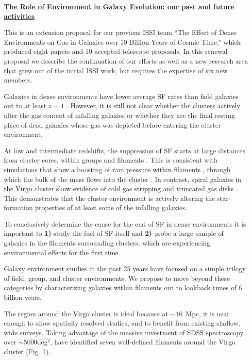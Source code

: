 \documentclass[11pt]{article}
\begin{document}
\centerline{{\bf \underline{ The Role of Environment in Galaxy Evolution: our past and future activities}}}
\medskip

This is an extension proposal for our previous ISSI team ``The Effect of Dense Environments on Gas in Galaxies over 10 Billion Years of Cosmic Time," which produced eight papers and 10 accepted telescope proposals.    In this renewal proposal we describe the continuation of our efforts as well as a new research area that grew out of the initial ISSI work, but requires the expertise of six new members. 

 Galaxies in dense environments
have lower average SF rates than field galaxies out
to at least $z \sim 1$ \citep[e.g.][]{Poggianti99,Lewis02,Gomez03,Postman05}.
However, it
is still not clear whether the clusters actively alter the gas content
of infalling galaxies or whether they are the final resting place of
dead galaxies whose gas was depleted before entering the cluster
environment.

At low and intermediate redshifts, the suppression of SF starts at large distances from cluster cores, within groups and filaments \citep{Lewis02,Gomez03,Laigle17}.  This is consistent with simulations that show a boosting of ram pressure within filaments \citep{Bahe13}, through which the bulk of the mass flows into the cluster \citep{Ramachandra15}. In contrast, spiral galaxies
in the Virgo cluster show evidence of cold gas stripping and truncated
gas disks
\citep{Koopmann98,Koopmann04,Dale01,Crowl05,Chung07}.  This
demonstrates that the cluster environment is actively altering the
star-formation properties of at least some of the infalling galaxies.  

To conclusively determine the cause for the
end of SF in dense environments it is important to \textbf{1)} study
the fuel of SF itself and {\bf 2)} probe a large sample of galaxies in the filaments surrounding clusters, which are experiencing environmental effects for the first time.  

  Galaxy environment studies in the past 25 years have focused on a simple trilogy of field, group, and cluster environments.  We propose to move beyond these categories by characterizing galaxies within filaments out to lookback times of 6 billion years.

The region around the Virgo cluster is ideal because at $\sim 16$~Mpc,  it is near enough to allow spatially resolved studies, and to benefit from existing shallow, wide surveys. Taking advantage of the massive investment of SDSS spectroscopy over $\sim 5000$deg$^2$, \citet{Kim16} have identified seven well-defined filaments around the Virgo cluster (Fig. 1).
\end{document}
